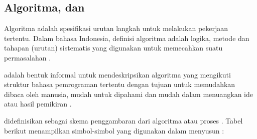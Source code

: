 \documentclass[../main.tex]{subfiles}
\begin{document}
    \subsection{Algoritma, {\Pseudocode} dan {\Flowchart}}
        Algoritma adalah spesifikasi urutan langkah untuk melakukan pekerjaan tertentu. Dalam bahasa Indonesia, definisi algoritma adalah logika, metode dan tahapan (urutan) sistematis yang digunakan untuk memecahkan suatu permasalahan \parencite{utami10}.

        {\Pseudocode} adalah bentuk informal untuk mendeskripsikan algoritma yang mengikuti struktur bahasa pemrograman tertentu dengan tujuan untuk memudahkan dibaca oleh manusia, mudah untuk dipahami dan mudah dalam menuangkan ide atau hasil pemikiran \parencite{harumy2016belajar}.

        {\Flowchart} didefinisikan sebagai skema penggambaran dari algoritma atau proses \parencite{harumy2016belajar}. Tabel berikut menampilkan simbol-simbol yang digunakan dalam menyusun {\flowchart} \parencite{samala2021pemrograman}:
\end{document}
